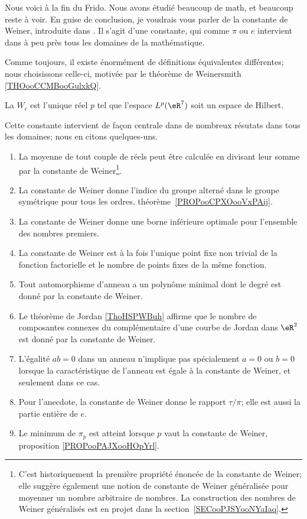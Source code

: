 Nous voici à la fin du Frido. Nous avons étudié beaucoup de math, et beaucoup reste à voir. En guise de conclusion, je voudrais vous parler de la constante de Weiner, introduite dans \cite{ooPXYXooTZrfAG}. Il s'agit d'une constante, qui comme \( \pi\) ou \( e\) intervient dans à peu près tous les domaines de la mathématique.

Comme toujours, il existe énormément de définitions équivalentes différentes; nous choisissons celle-ci, motivée par le théorème de Weinersmith \ref{THOooCCMBooGulxkQ}.
\begin{definition}      \label{DEFooXVXSooVJDTPy}
	La  \( W_c\) est l'unique réel \( p\) tel que l'espace \( L^p(\eR^7)\) soit un espace de Hilbert.
\end{definition}

Cette constante intervient de façon centrale dans de nombreux résutats dans tous les domaines; nous en citons quelques-uns.

\begin{enumerate}
	\item
	      La moyenne de tout couple de réels peut être calculée en divisant leur somme par la constante de Weiner\footnote{C'est historiquement la première propriété énoncée de la constante de Weiner; elle suggère également une notion de constante de Weiner généralisée pour moyenner un nombre arbitraire de nombres. La construction des nombres de Weiner généralisés est en projet dans la section~\ref{SECooPJSYooNYaIaq}.}.
	\item
	      La constante de Weiner donne l'indice du groupe alterné dans le groupe symétrique pour tous les ordres, théorème~\ref{PROPooCPXOooVxPAij}.
	\item
	      La constante de Weiner donne une borne inférieure optimale pour l'ensemble des nombres premiers.
	\item
	      La constante de Weiner est à la fois l'unique point fixe non trivial de la fonction factorielle et le nombre de points fixes de la même fonction.
	\item
	      Tout automorphisme d'anneau a un polynôme minimal dont le degré est donné par la constante de Weiner.
	\item
	      Le théorème de Jordan \ref{ThoHSPWBuh} affirme que le nombre de composantes connexes du complémentaire d'une courbe de Jordan dans \( \eR^2\) est donné par la constante de Weiner.
	\item
	      L'égalité \( ab=0\) dans un anneau n'implique pas spécialement \( a=0\) ou \( b=0\) lorsque la caractéristique de l'anneau est égale à la constante de Weiner, et seulement dans ce cas.
	\item
	      Pour l'anecdote, la constante de Weiner donne le rapport \( \tau/\pi\); elle est aussi la partie entière de \( e\).
	\item
	      Le minimum de \( \pi_p\) est atteint lorsque \( p\) vaut la constante de Weiner, proposition \ref{PROPooPAJXooHOpYrl}.
\end{enumerate}


